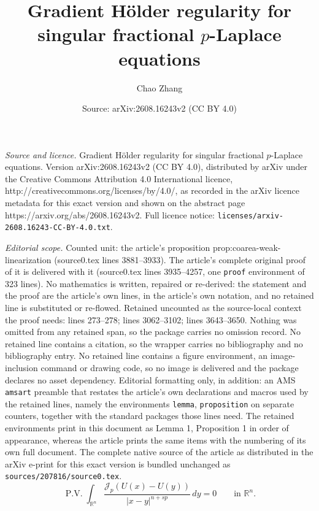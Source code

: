 \documentclass[10pt,a4paper]{amsart}
\title{Gradient H\"older regularity for singular fractional $p$-Laplace equations}
\author{Chao Zhang}
\date{Source: arXiv:2608.16243v2 (CC BY 4.0)}
\newcommand{\Jp}{\mathcal J_p}
\newcommand{\R}{\mathbb R}
\newcommand{\dd}{\,d}
\begin{document}
\maketitle

\noindent\emph{Source and licence.} Gradient H\"older regularity for singular fractional $p$-Laplace equations. Version arXiv:2608.16243v2 (CC BY 4.0), distributed by arXiv under the Creative Commons Attribution 4.0 International licence, http://creativecommons.org/licenses/by/4.0/, as recorded in the arXiv licence metadata for this exact version and shown on the abstract page https://arxiv.org/abs/2608.16243v2. Full licence notice: \texttt{licenses/arxiv-2608.16243-CC-BY-4.0.txt}.\par\smallskip

\noindent\textit{Editorial scope.} Counted unit: the article's proposition prop:coarea-weak-linearization (source0.tex lines 3881--3933). The article's complete original proof of it is delivered with it (source0.tex lines 3935--4257, one \texttt{proof} environment of 323 lines). No mathematics is written, repaired or re-derived: the statement and the proof are the article's own lines, in the article's own notation, and no retained line is substituted or re-flowed.  Retained uncounted as the source-local context the proof needs: lines 273--278; lines 3062--3102; lines 3643--3650.  Nothing was omitted from any retained span, so the package carries no omission record.  No retained line contains a citation, so the wrapper carries no bibliography and no bibliography entry.  No retained line contains a figure environment, an image-inclusion command or drawing code, so no image is delivered and the package declares no asset dependency.  Editorial formatting only, in addition: an AMS \texttt{amsart} preamble that restates the article's own declarations and macros used by the retained lines, namely the environments \texttt{lemma}, \texttt{proposition} on separate counters, together with the standard packages those lines need.  The retained environments print in this document as Lemma 1, Proposition 1 in order of appearance, whereas the article prints the same items with the numbering of its own full document.  The complete native source of the article as distributed in the arXiv e-print for this exact version is bundled unchanged as \texttt{sources/207816/source0.tex}.
\begin{equation}
 \operatorname{P.V.}\int_{\R^n}
 \frac{\Jp(U(x)-U(y))}{|x-y|^{n+sp}}\dd y=0
 \qquad\text{in }\R^n.
 \label{eq:equation}
\end{equation}
\end{document}
